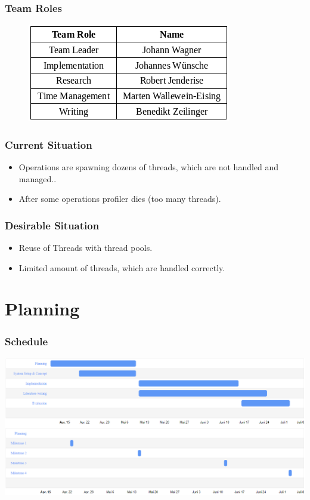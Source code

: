 \documentclass{beamer}
\begin{document}
	\begin{frame}
		\frametitle{Team Roles}
		\begin{figure}
			\centering
			\includegraphics[width=0.7\linewidth]{img/TeamRoles}
			\caption{}
			\label{fig:teamroles}
		\end{figure}
	\end{frame}
	
	\begin{frame}
		\frametitle{Current Situation}
		\begin{itemize}
			\item Operations are spawning dozens of threads, which are not handled and managed..
			\item After some operations profiler dies (too many threads).
		\end{itemize}
	\end{frame}

	\begin{frame}
		\frametitle{Desirable Situation}
		\begin{itemize}
			\item Reuse of Threads with thread pools.
			\item Limited amount of threads, which are handled correctly.
		\end{itemize}
	\end{frame}

\section{Planning}
\begin{frame}
\frametitle{Schedule}
\includegraphics[width=1.0\textwidth]{img/schedule.png}
\end{frame}
\end{document}
